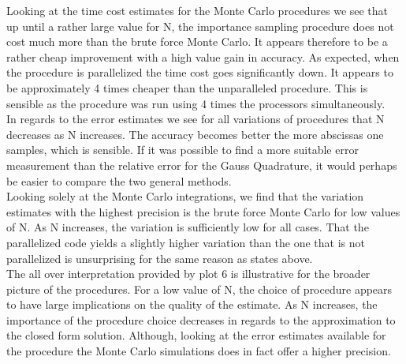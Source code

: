 \documentclass[%
reprint,
amsmath,amssymb,
aps,
]{revtex4-1}
\begin{document}
Looking at the time cost estimates for the Monte Carlo procedures we see that up until a rather large value for N, the importance sampling procedure does not cost much more than the brute force Monte Carlo. It appears therefore to be a rather cheap improvement with a high value gain in accuracy. As expected, when the procedure is parallelized the time cost goes significantly down. It appears to be approximately 4 times cheaper than the unparalleled procedure. This is sensible as the procedure was run using 4 times the processors simultaneously.\\ \indent 
In regards to the error estimates we see for all variations of procedures that N decreases as N increases. The accuracy becomes better the more abscissas one samples, which is sensible. If it was possible to find a more suitable error measurement than the relative error for the Gauss Quadrature, it would perhaps be easier to compare the two general methods. \\ \indent 
Looking solely at the Monte Carlo integrations, we find that the variation estimates with the highest precision is the brute force Monte Carlo for low values of N. As N increases, the variation is sufficiently low for all cases. That the parallelized code yields a slightly higher variation than the one that is not parallelized is unsurprising for the same reason as states above. 
 \\ \indent 
The all over interpretation provided by plot 6 is illustrative for the broader picture of the procedures. For a low value of N, the choice of procedure appears to have large implications on the quality of the estimate. As N increases, the importance of the procedure choice decreases in regards to the approximation to the closed form solution. Although, looking at the error estimates available for the procedure the Monte Carlo simulations does in fact offer a higher precision.
\end{document}
